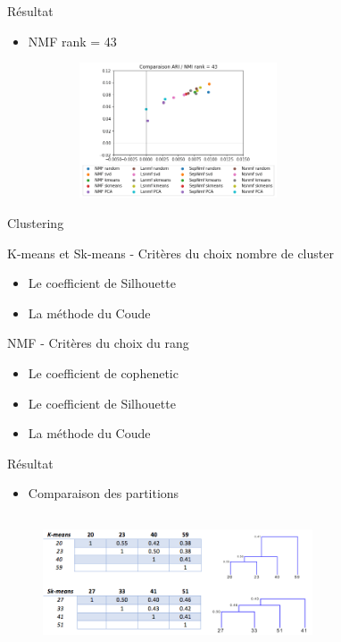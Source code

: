 \documentclass{beamer}
\begin{document}
\begin{frame}{Résultat}

\begin{itemize}
  \item NMF rank = 43    
\end{itemize}
\begin{figure}
\includegraphics[width=8cm ,height= 4cm]{ari_nmi_rank43.png}
\end{figure}

\end{frame}



\begin{frame}{Clustering}
\begin{block}{K-means et Sk-means - Critères du choix nombre de cluster}
\begin{itemize}
\item Le coefficient de Silhouette
\item La méthode du Coude 
\end{itemize}
\end{block}

\begin{block}{NMF - Critères du choix du rang}
\begin{itemize}
\item Le coefficient de cophenetic
\item Le coefficient de Silhouette
\item La méthode du Coude 
\end{itemize}
\end{block}
\end{frame}




\begin{frame}{Résultat}

\begin{itemize}
  \item Comparaison des partitions
\end{itemize}
\begin{figure}
\includegraphics[width=8cm ,height= 4cm]{ari_nmi.png}
\end{figure}

\end{frame}
\end{document}
